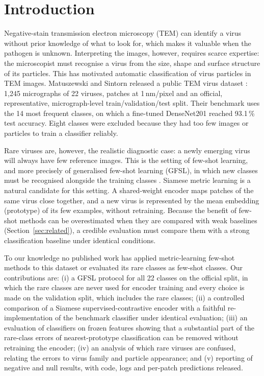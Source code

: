 \documentclass[preprint,review,12pt]{elsarticle}
\begin{document}
\section{Introduction}
\label{sec:intro}

Negative-stain transmission electron microscopy (TEM) can identify a virus without prior knowledge of what to look for, which makes it valuable when the pathogen is unknown. Interpreting the images, however, requires scarce expertise: the microscopist must recognise a virus from the size, shape and surface structure of its particles. This has motivated automatic classification of virus particles in TEM images. Matuszewski and Sintorn released a public TEM virus dataset \cite{MS21,MS21data}: 1,245 micrographs of 22 viruses, patches at 1\,nm/pixel and an official, representative, micrograph-level train/validation/test split. Their benchmark uses the 14 most frequent classes, on which a fine-tuned DenseNet201 reached 93.1\,\% test accuracy. Eight classes were excluded because they had too few images or particles to train a classifier reliably.

Rare viruses are, however, the realistic diagnostic case: a newly emerging virus will always have few reference images. This is the setting of few-shot learning, and more precisely of generalised few-shot learning (GFSL), in which new classes must be recognised alongside the training classes \cite{GK18}. Siamese metric learning is a natural candidate for this setting. A shared-weight encoder maps patches of the same virus close together, and a new virus is represented by the mean embedding (prototype) of its few examples, without retraining. Because the benefit of few-shot methods can be overestimated when they are compared with weak baselines (Section~\ref{sec:related}), a credible evaluation must compare them with a strong classification baseline under identical conditions.

To our knowledge no published work has applied metric-learning few-shot methods to this dataset or evaluated its rare classes as few-shot classes. Our contributions are:
(i) a GFSL protocol for all 22 classes on the official split, in which the rare classes are never used for encoder training and every choice is made on the validation split, which includes the rare classes;
(ii) a controlled comparison of a Siamese supervised-contrastive encoder with a faithful re-implementation of the benchmark classifier under identical evaluation;
(iii) an evaluation of classifiers on frozen features showing that a substantial part of the rare-class errors of nearest-prototype classification can be removed without retraining the encoder;
(iv) an analysis of which rare viruses are confused, relating the errors to virus family and particle appearance; and
(v) reporting of negative and null results, with code, logs and per-patch predictions released.
\end{document}
